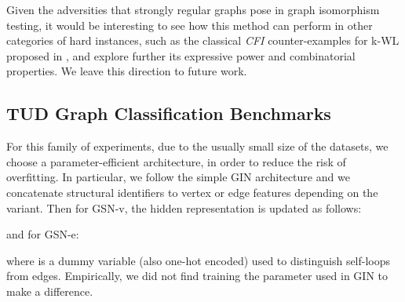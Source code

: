 Given the adversities that strongly regular graphs pose in graph isomorphism testing, it would be interesting to see how this method can perform in other categories of hard instances, such as the classical  \textit{CFI} counter-examples for k-WL proposed in \cite{DBLP:journals/combinatorica/CaiFI92}, and explore further its expressive power and combinatorial properties. We leave this direction to future work.


\subsection{TUD Graph Classification Benchmarks}

For this family of experiments, due to the usually small size of the datasets, we choose a parameter-efficient architecture, in order to reduce the risk of overfitting. In particular, we follow the simple GIN architecture \cite{xu2018how} and we concatenate structural identifiers to vertex or edge features depending on the variant. Then for GSN-v, the hidden representation is updated as follows:

and for GSN-e:

where  is a dummy variable (also one-hot encoded) used to distinguish self-loops from edges. Empirically, we did not find training the  parameter used in GIN to make a difference. 
 


        
         
         
         
         
         
        
       
        


                
        
        

         
         
         
         
         


        

        
        
        

        
        
        
        
        
        

